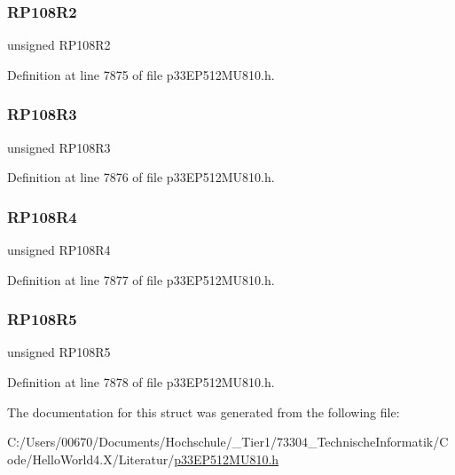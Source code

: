 \subsubsection{\texorpdfstring{R\+P108\+R2}{RP108R2}}
{\footnotesize\ttfamily unsigned R\+P108\+R2}



Definition at line 7875 of file p33\+E\+P512\+M\+U810.\+h.

\mbox{\label{structtag_r_p_o_r11_b_i_t_s_a138aec531d59b764a94cfa230b84c83a}} 
\subsubsection{\texorpdfstring{R\+P108\+R3}{RP108R3}}
{\footnotesize\ttfamily unsigned R\+P108\+R3}



Definition at line 7876 of file p33\+E\+P512\+M\+U810.\+h.

\mbox{\label{structtag_r_p_o_r11_b_i_t_s_abc97389fb9858bb8b533b4eb8ca91122}} 
\subsubsection{\texorpdfstring{R\+P108\+R4}{RP108R4}}
{\footnotesize\ttfamily unsigned R\+P108\+R4}



Definition at line 7877 of file p33\+E\+P512\+M\+U810.\+h.

\mbox{\label{structtag_r_p_o_r11_b_i_t_s_a0472d693e3ec668557f970eb069ad94f}} 
\subsubsection{\texorpdfstring{R\+P108\+R5}{RP108R5}}
{\footnotesize\ttfamily unsigned R\+P108\+R5}



Definition at line 7878 of file p33\+E\+P512\+M\+U810.\+h.



The documentation for this struct was generated from the following file\+:\begin{DoxyCompactItemize}
\item 
C\+:/\+Users/00670/\+Documents/\+Hochschule/\+\_\+\+Tier1/73304\+\_\+\+Technische\+Informatik/\+Code/\+Hello\+World4.\+X/\+Literatur/\hyperlink{p33_e_p512_m_u810_8h}{p33\+E\+P512\+M\+U810.\+h}\end{DoxyCompactItemize}
